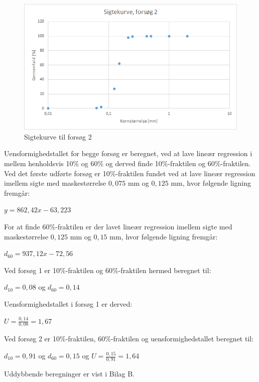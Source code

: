 \begin{figure}[htbp]
		\centering
		\includegraphics[width=1.0\textwidth]{billeder/sigtekurve2.png}
		\caption{Sigtekurve til forsøg 2}
		\label{fig:sigtekurve2}
\end{figure}

Uensformighedstallet for begge forsøg er beregnet, ved at lave lineær regression i mellem henholdsvis 10\% og 60\% og derved finde 10\%-fraktilen og 60\%-fraktilen.
\newline
\newline
Ved det første udførte forsøg er 10\%-fraktilen fundet ved at lave lineær regression imellem sigte med maskestørrelse $0,\!075$ mm og $0,\!125$ mm, hvor følgende ligning fremgår: 

\begin{center}
	$y = 862,\!42x - 63,\!223$
\end{center}

For at finde 60\%-fraktilen er der lavet lineær regression imellem sigte med maskestørrelse $0,\!125$ mm og $0,\!15$ mm, hvor følgende ligning fremgår:

\begin{center}
	$d_{60}=937,\!12x - 72,\!56$
\end{center}

Ved forsøg 1 er 10\%-fraktilen og 60\%-fraktilen hermed beregnet til: 
\begin{center}
	$d_{10} = 0,\!08$ og $d_{60} = 0,\!14$
\end{center} 

Uensformighedstallet i forsøg 1 er derved:
\begin{center}
	$U = \frac{0,\!14}{0,\!08} = 1,\!67$
\end{center}

Ved forsøg 2 er 10\%-fraktilen, 60\%-fraktilen og uensformighedstallet beregnet til:
\begin{center}
	$d_{10} = 0,\!91$ og $d_{60} = 0,\!15$ og $U = \frac{0,\!15}{0,\!91} = 1,\!64$
\end{center} 
Uddybbende beregninger er vist i Bilag B.

